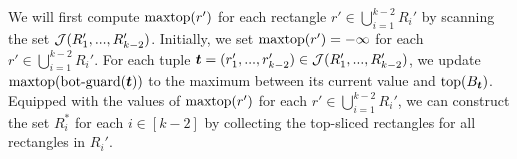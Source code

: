 We will first compute $\mathrm{maxtop}(r')$ for each rectangle $r' \in \bigcup_{i = 1}^{k-2}R_{i}'$ by scanning the set $\mathcal{J}(R_1',...,R_{k-2}')$. Initially, we set $\mathrm{maxtop}(r') = -\infty$ for each $r' \in \bigcup_{i = 1}^{k-2}R_{i}'$. For each tuple $\textrm{\boldmath${t}$} = (r_1',...,r_{k-2}') \in \mathcal{J}(R_1',...,R_{k-2}')$, we update $\mathrm{maxtop}(\mathrm{bot\text{-}guard}(\textrm{\boldmath${t}$}))$ to the maximum between its current value and $\mathrm{top}(B_{\textrm{\boldmath${t}$}})$. 
Equipped with the values of $\mathrm{maxtop}(r')$ for each $r' \in \bigcup_{i = 1}^{k-2}R_{i}'$, we can construct the set $R_i^*$ for each $i \in [k-2]$ by collecting the top-sliced rectangles for all rectangles in $R_i'$.